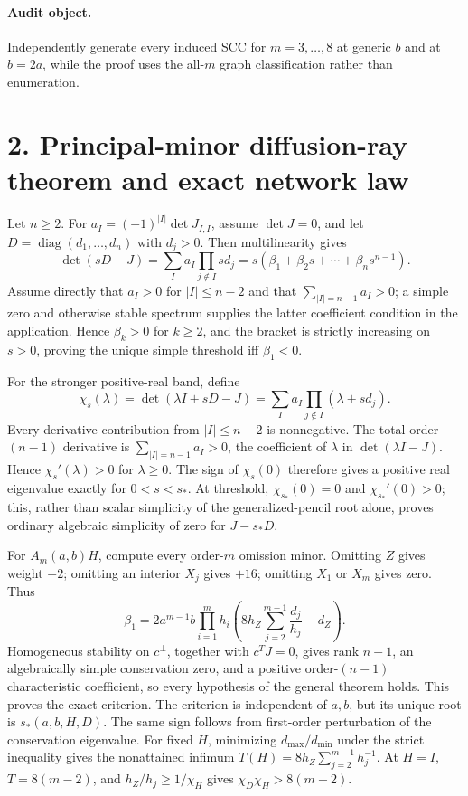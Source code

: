 \documentclass[10pt]{article}
\newcommand{\diag}{\operatorname{diag}}
\begin{document}
\paragraph{Audit object.} Independently generate every induced SCC for $m=3,\ldots,8$ at generic $b$ and at $b=2a$, while the proof uses the all-$m$ graph classification rather than enumeration.

\newpage
\section*{2. Principal-minor diffusion-ray theorem and exact network law}
Let $n\ge2$.  For $a_I=(-1)^{|I|}\det J_{I,I}$, assume $\det J=0$, and let
$D=\diag(d_1,\ldots,d_n)$ with $d_j>0$.  Then multilinearity gives
\[
\det(sD-J)=\sum_Ia_I\prod_{j\notin I}sd_j
=s(\beta_1+\beta_2s+\cdots+\beta_ns^{n-1}).
\]
Assume directly that $a_I>0$ for $|I|\le n-2$ and that
$\sum_{|I|=n-1}a_I>0$; a simple zero and otherwise stable spectrum supplies
the latter coefficient condition in the application.  Hence $\beta_k>0$
for $k\ge2$, and the bracket is strictly increasing on $s>0$, proving the
unique simple threshold iff $\beta_1<0$.

For the stronger positive-real band, define
\[
\chi_s(\lambda)=\det(\lambda I+sD-J)
=\sum_Ia_I\prod_{j\notin I}(\lambda+sd_j).
\]
Every derivative contribution from $|I|\le n-2$ is nonnegative. The total
order-$(n-1)$ derivative is $\sum_{|I|=n-1}a_I>0$, the coefficient of
$\lambda$ in $\det(\lambda I-J)$. Hence $\chi_s'(\lambda)>0$ for $\lambda\ge0$. The sign of $\chi_s(0)$ therefore gives a positive real eigenvalue exactly for $0<s<s_*$.
At threshold, $\chi_{s_*}(0)=0$ and $\chi_{s_*}'(0)>0$; this, rather than
scalar simplicity of the generalized-pencil root alone, proves ordinary
algebraic simplicity of zero for $J-s_*D$.

For $A_m(a,b)H$, compute every order-$m$ omission minor. Omitting $Z$ gives weight $-2$; omitting an interior $X_j$ gives $+16$; omitting $X_1$ or $X_m$ gives zero. Thus
\[
\beta_1=2a^{m-1}b\prod_{i=1}^mh_i
\left(8h_Z\sum_{j=2}^{m-1}\frac{d_j}{h_j}-d_Z\right).
\]
Homogeneous stability on $c^\perp$, together with $c^TJ=0$, gives rank
$n-1$, an algebraically simple conservation zero, and a positive
order-$(n-1)$ characteristic coefficient, so every hypothesis of the general
theorem holds.  This proves the exact criterion.  The criterion is independent
of $a,b$, but its unique root is $s_*(a,b,H,D)$.  The same sign follows from
first-order perturbation of the conservation eigenvalue. For fixed $H$,
minimizing $d_{\max}/d_{\min}$ under the strict inequality gives the
nonattained infimum $T(H)=8h_Z\sum_{j=2}^{m-1} h_j^{-1}$. At $H=I$,
$T=8(m-2)$, and $h_Z/h_j\ge1/\chi_H$ gives
$\chi_D\chi_H>8(m-2)$.
\end{document}
